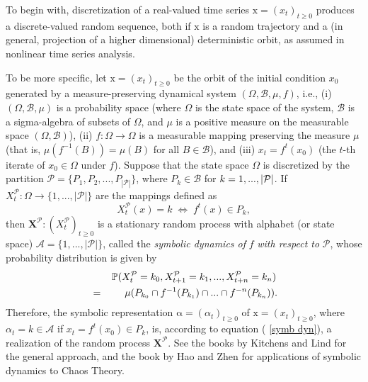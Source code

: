\documentclass[%
 aip,
 amsmath,amssymb,
 reprint,%
]{revtex4-1}
\begin{document}
To begin with, discretization of a real-valued time series $\mathrm{x}%
=(x_{t})_{t\geq 0}$ produces a discrete-valued random sequence, both if $%
\mathrm{x}$ is a random trajectory and a (in general, projection of a higher
dimensional) deterministic orbit, as assumed in nonlinear time series
analysis.

To be more specific, let $\mathrm{x}=(x_{t})_{t\geq 0}$ be the orbit of the
initial condition $x_{0}$ generated by a measure-preserving dynamical system 
$(\Omega ,\mathcal{B},\mu ,f)$, i.e., (i) $(\Omega ,\mathcal{B},\mu )$ is a
probability space (where $\Omega $ is the state space of the system, $%
\mathcal{B}$ is a sigma-algebra of subsets of $\Omega $, and $\mu $ is a
positive measure on the measurable space $(\Omega ,\mathcal{B})$), (ii) $%
f:\Omega \rightarrow \Omega $ is a measurable mapping preserving the measure 
$\mu $ (that is, $\mu (f^{-1}(B))=\mu (B)$ for all $B\in \mathcal{B}$), and
(iii) $x_{t}=f^{t}(x_{0})$ (the $t$-th iterate of $x_{0}\in \Omega $ under $%
f $). Suppose that the state space $\Omega $ is discretized by the partition 
$\mathcal{P}=\{P_{1},P_{2},...,P_{\left\vert \mathcal{P}\right\vert }%
\mathcal{\}}$, where $P_{k}\in \mathcal{B}$ for $k=1,...,\left\vert \mathcal{%
P}\right\vert $. If $X_{t}^{\mathcal{P}}:\Omega \rightarrow
\{1,...,\left\vert \mathcal{P}\right\vert \}$ are the mappings defined as%
\begin{equation}
X_{t}^{\mathcal{P}}(x)=k\;\Leftrightarrow \;f^{t}(x)\in P_{k},
\label{symb dyn}
\end{equation}%
then $\mathbf{X}^{\mathcal{P}}:(X_{t}^{\mathcal{P}})_{t\geq 0}$ is a
stationary random process with alphabet (or state space) $\mathcal{A}%
=\{1,...,\left\vert \mathcal{P}\right\vert \}$, called the \textit{symbolic
dynamics of} $f$ \textit{with respect to} $\mathcal{P}$, whose probability
distribution is given by \cite{Hirata2023}%
\begin{eqnarray}
&&\left. \mathbb{P}(X_{t}^{\mathcal{P}}=k_{0},X_{t+1}^{\mathcal{P}%
}=k_{1},...,X_{t+n}^{\mathcal{P}}=k_{n})\right.  \label{P=mu} \\
&=&\mu (P_{k_{0}}\cap f^{-1}(P_{k_{1}})\cap ...\cap f^{-n}(P_{k_{n}})). 
\notag
\end{eqnarray}%
Therefore, the symbolic representation $\mathrm{\alpha }=(\alpha
_{t})_{t\geq 0}$ of $\mathrm{x}=(x_{t})_{t\geq 0}$, where $\alpha _{t}=k\in 
\mathcal{A}$ if $x_{t}=f^{t}(x_{0})\in P_{k}$, is, according to equation (%
\ref{symb dyn}), a realization of the random process $\mathbf{X}^{\mathcal{P}%
}$. See the books by Kitchens \cite{Kitchens1998} and Lind \cite{Lind2003}
for the general approach, and the book by Hao and Zhen \cite{Hao1998} for
applications of symbolic dynamics to Chaos Theory.
\end{document}
